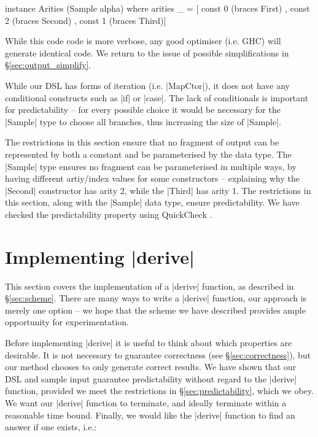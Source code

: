 \documentclass{llncs}
\begin{document}
\begin{code}
instance Arities (Sample alpha) where
    arities _ =  [  const 0 (braces First)
                 ,  const 2 (braces Second)
                 ,  const 1 (braces Third)]
\end{code}

While this code code is more verbose, any good optimiser (i.e. GHC) will generate identical code. We return to the issue of possible simplifications in \S\ref{sec:output_simplify}.

While our DSL has forms of iteration (i.e. |MapCtor|), it does not have any conditional constructs such as |if| or |case|. The lack of conditionals is important for predictability -- for every possible choice it would be necessary for the |Sample| type to choose all branches, thus increasing the size of |Sample|.

The restrictions in this section ensure that no fragment of output can be represented by both a constant and be parameterised by the data type. The |Sample| type ensures no fragment can be parameterised in multiple ways, by having different artiy/index values for some constructors -- explaining why the |Second| constructor has arity 2, while the |Third| has arity 1. The restrictions in this section, along with the |Sample| data type, ensure predictability. We have checked the predictability property using QuickCheck \cite{quickcheck}.

\section{Implementing |derive|}
\label{sec:guess}

This section covers the implementation of a |derive| function, as described in \S\ref{sec:scheme}. There are many ways to write a |derive| function, our approach is merely one option -- we hope that the scheme we have described provides ample opportunity for experimentation.

Before implementing |derive| it is useful to think about which properties are desirable. It is not necessary to guarantee correctness (see \S\ref{sec:correctness}), but our method chooses to only generate correct results. We have shown that our DSL and sample input guarantee predictability without regard to the |derive| function, provided we meet the restrictions in \S\ref{sec:predictability}, which we obey. We want our |derive| function to terminate, and ideally terminate within a reasonable time bound. Finally, we would like the |derive| function to find an answer if one exists, i.e.:
\end{document}
